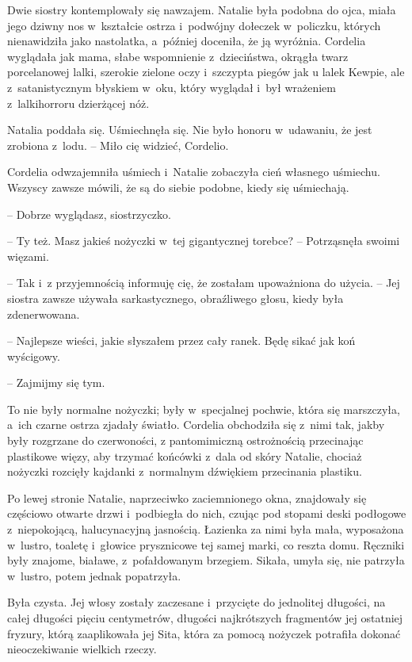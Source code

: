 \documentclass[oneside,polish,11pt,sfheadings]{mwbk}
\begin{document}
Dwie siostry kontemplowały się nawzajem. Natalie była podobna do ojca,
miała jego dziwny nos w~kształcie ostrza i~podwójny dołeczek w~policzku,
których nienawidziła jako nastolatka, a~później doceniła, że ją
wyróżnia. Cordelia wyglądała jak mama, słabe wspomnienie z~dzieciństwa,
okrągła twarz porcelanowej lalki, szerokie zielone oczy i~szczypta
piegów jak u lalek Kewpie, ale z~satanistycznym błyskiem w~oku, który
wyglądał i~był wrażeniem z~lalki\dywiz horroru dzierżącej nóż.

Natalia poddała się. Uśmiechnęła się. Nie było honoru w~udawaniu, że
jest zrobiona z~lodu. -- Miło cię widzieć, Cordelio.

Cordelia odwzajemniła uśmiech i~Natalie zobaczyła cień własnego
uśmiechu. Wszyscy zawsze mówili, że są do siebie podobne, kiedy się
uśmiechają.

-- Dobrze wyglądasz, siostrzyczko.

-- Ty też. Masz jakieś nożyczki w~tej gigantycznej torebce? -- Potrząsnęła
swoimi więzami.

-- Tak i~z przyjemnością informuję cię, że zostałam upoważniona do
użycia. -- Jej siostra zawsze używała sarkastycznego, obraźliwego głosu,
kiedy była zdenerwowana.

-- Najlepsze wieści, jakie słyszałem przez cały ranek. Będę sikać jak koń
wyścigowy.

-- Zajmijmy się tym. 

To nie były normalne nożyczki; były w~specjalnej
pochwie, która się marszczyła, a~ich czarne ostrza zjadały światło.
Cordelia obchodziła się z~nimi tak, jakby były rozgrzane do czerwoności,
z pantomimiczną ostrożnością przecinając plastikowe więzy, aby trzymać
końcówki z~dala od skóry Natalie, chociaż nożyczki rozcięły kajdanki z~normalnym dźwiękiem przecinania plastiku.

Po lewej stronie Natalie, naprzeciwko zaciemnionego okna, znajdowały się
częściowo otwarte drzwi i~podbiegła do nich, czując pod stopami deski
podłogowe z~niepokojącą, halucynacyjną jasnością. Łazienka za nimi była
mała, wyposażona w~lustro, toaletę i~głowice prysznicowe tej samej
marki, co reszta domu. Ręczniki były znajome, białawe, z~pofałdowanym
brzegiem. Sikała, umyła się, nie patrzyła w~lustro, potem jednak
popatrzyła.

Była czysta. Jej włosy zostały zaczesane i~przycięte do jednolitej
długości, na całej długości pięciu centymetrów, długości najkrótszych
fragmentów jej ostatniej fryzury, którą zaaplikowała jej Sita, która za
pomocą nożyczek potrafiła dokonać nieoczekiwanie wielkich rzeczy.
\end{document}
